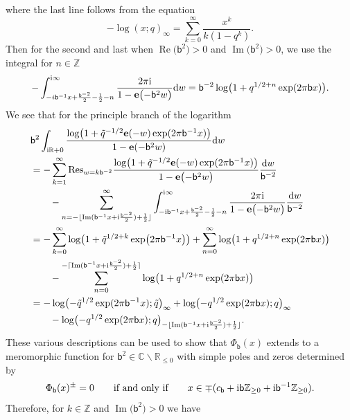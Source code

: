 \documentclass[pdftex]{sigma}
\numberwithin{equation}{section}
\def\BZ{\mathbb{Z}}
\def\BR{\mathbb{R}}
\def\BC{\mathbb{C}}
\def\tq{\tilde{q}}
\def\e{\mathbf e}
\def\BZ{\mathbb Z}
\def\BR{\mathbb R}
\def\BC{\mathbb C}
\def\tq{\tilde{q}}
\def\Re{\operatorname{Re}}
\def\Im{\operatorname{Im}}
\begin{document}
where the last line follows from the equation~\cite[Proposition~2]{Zagier:Dilog}
\[
 -\log(x;q)_{\infty}
  =
 \sum_{k=0}^{\infty}\frac{x^k}{k(1-q^{k})} .
\]
Then for the second and last when $\Re\bigl(\mathsf{b}^{2}\bigr)>0$ and $\Im\bigl(\mathsf{b}^{2}\bigr)>0$, we use the integral for $n\in\BZ$
\[
 -\int_{-i\mathsf{b}^{-1}x+\frac{\mathsf{b}^{-2}}{2}-\frac{1}{2}-n}^{{\rm i}\infty}\frac{2\pi {\rm i}}{1-\e\bigl(-\mathsf{b}^{2}w\bigr)}{\rm d}w
  =
 \mathsf{b}^{-2}\log\bigl(1+q^{1/2+n}\exp(2\pi\mathsf{b}x)\bigr) .
\]
We see that for the principle branch of the logarithm
\begin{align*}
 &\mathsf{b}^{2} \int_{{\rm i}\BR+0}\frac{\log\bigl(1+\tq^{-1/2}\e(-w)\exp(2\pi\mathsf{b}^{-1}x)\bigl)}{1-\e(-\mathsf{b}^{2}w)}{\rm d}w\\
 & =
 -\sum_{k=1}^{\infty}\mathrm{Res}_{w=k\mathsf{b}^{-2}}\frac{\log\bigl(1+\tq^{-1/2}\e(-w)\exp(2\pi\mathsf{b}^{-1}x)\bigr)} {1-\e\bigl(-\mathsf{b}^{2}w\bigr)}\frac{{\rm d}w}{\mathsf{b}^{-2}}\\
 &\qquad{}-\sum_{n=-\lfloor\Im(\mathsf{b}^{-1}x+{\rm i} \frac{\mathsf{b}^{-2}}{2})+\frac{1}{2}\rfloor}^{\infty}\int_{-{\rm i}\mathsf{b}^{-1}x+\frac{\mathsf{b}^{-2}}{2}-\frac{1}{2}-n}^{{\rm i}\infty}\frac{2\pi {\rm i}}{1-\e\bigl(-\mathsf{b}^{2}w\bigr)}\frac{{\rm d} w}{\mathsf{b}^{-2}}\\
 & =
 -\sum_{k=0}^{\infty}\log\bigl(1+\tq^{1/2+k}\exp\bigl(2\pi\mathsf{b}^{-1}x\bigr)\bigr)
 +\sum_{n=0}^{\infty}\log\bigl(1+q^{1/2+n}\exp(2\pi\mathsf{b}x)\bigr)\\
 &\qquad{}-\sum_{n=0}^{-\lceil\Im(\mathsf{b}^{-1}x+{\rm i}\frac{\mathsf{b}^{-2}}{2})+\frac{1}{2}\rceil}\log\bigl(1+q^{1/2+n}\exp(2\pi\mathsf{b}x)\bigr)\\
 & =
 -\log\bigl(-\tq^{1/2}\exp(2\pi\mathsf{b}^{-1}x);\tq\bigr)_{\infty}
 +\log\bigl(-q^{1/2}\exp(2\pi\mathsf{b}x);q\bigr)_{\infty}\\
 &\qquad{}-\log\bigl(-q^{1/2}\exp(2\pi\mathsf{b}x);q\bigr)_{-\lfloor\Im(\mathsf{b}^{-1}x+{\rm i}\frac{\mathsf{b}^{-2}}{2})+\frac{1}{2}\rfloor}.
\end{align*}
These various descriptions can be used to show that $\Phi_{\mathsf{b}}(x)$ extends to a meromorphic function for $\mathsf{b}^{2}\in\BC\smallsetminus \BR_{\leq0}$ with simple poles and zeros determined by
\[
 \Phi_{\mathsf{b}}(x)^{\pm} =0
 \qquad\text{if and only if}\qquad
 x\in\mp(c_{\mathsf{b}}+{\rm i}\mathsf{b}\BZ_{\geq0}+{\rm i}\mathsf{b}^{-1}\BZ_{\geq0}) .
\]
Therefore, for $k\in\BZ$ and $\Im\bigl(\mathsf{b}^{2}\bigr)>0$ we have
\end{document}
